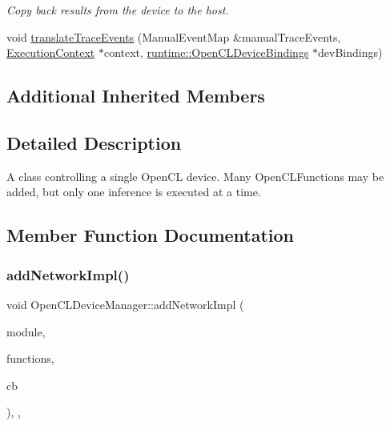 \begin{DoxyCompactItemize}
\begin{DoxyCompactList}\small\item\em Copy back results from the device to the host. \end{DoxyCompactList}\item 
void \hyperlink{classglow_1_1runtime_1_1_open_c_l_device_manager_a32a22b300fdef9738ed026af279e296a}{translate\+Trace\+Events} (Manual\+Event\+Map \&manual\+Trace\+Events, \hyperlink{classglow_1_1_execution_context}{Execution\+Context} $\ast$context, \hyperlink{structglow_1_1runtime_1_1_open_c_l_device_bindings}{runtime\+::\+Open\+C\+L\+Device\+Bindings} $\ast$dev\+Bindings)
\end{DoxyCompactItemize}
\subsection*{Additional Inherited Members}


\subsection{Detailed Description}
A class controlling a single Open\+CL device. Many Open\+C\+L\+Functions may be added, but only one inference is executed at a time. 

\subsection{Member Function Documentation}
\mbox{\label{classglow_1_1runtime_1_1_open_c_l_device_manager_a062d49988e839e94d4b56ef18851d0f2}} 
\subsubsection{\texorpdfstring{add\+Network\+Impl()}{addNetworkImpl()}}
{\footnotesize\ttfamily void Open\+C\+L\+Device\+Manager\+::add\+Network\+Impl (\begin{DoxyParamCaption}\item[{const \hyperlink{classglow_1_1_module}{Module} $\ast$}]{module,  }\item[{Function\+Map\+Ty}]{functions,  }\item[{Ready\+C\+B\+Ty}]{cb }\end{DoxyParamCaption})\hspace{0.3cm}{\ttfamily [override]}, {\ttfamily [protected]}, {\ttfamily [virtual]}}

